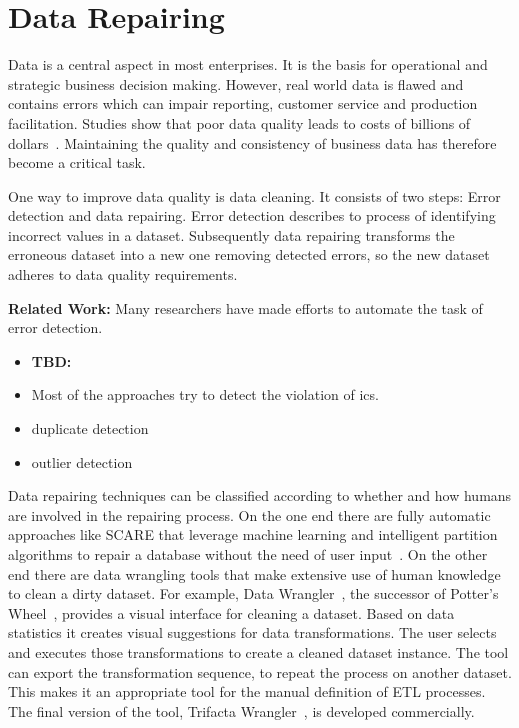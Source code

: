 
\section{Data Repairing}\label{sec:introduction}
  Data is a central aspect in most enterprises.
  It is the basis for operational and strategic business decision making.
  However, real world data is flawed and contains errors which can impair reporting, customer service and production facilitation.
  Studies show that poor data quality leads to costs of billions of dollars~\cite{Redman:quality_disaster, cost_of_low_qual}.
  Maintaining the quality and consistency of business data has therefore become a critical task.

  One way to improve data quality is data cleaning.
  It consists of two steps: Error detection and data repairing.
  Error detection describes to process of identifying incorrect values in a dataset.
  Subsequently data repairing transforms the erroneous dataset into a new one removing detected errors, so the new dataset adheres to data quality requirements.

  \bigskip
  \textbf{Related Work:}
  Many researchers have made efforts to automate the task of error detection.
  \begin{itemize}
    \item \textbf{TBD:}
    \item Most of the approaches try to detect the violation of \glspl{ic}.
    \item duplicate detection
    \item outlier detection
  \end{itemize}

  Data repairing techniques can be classified according to whether and how humans are involved in the repairing process.
  On the one end there are fully automatic approaches like SCARE that leverage machine learning and intelligent partition algorithms to repair a database without the need of user input~\cite{scare}.
  On the other end there are data wrangling tools that make extensive use of human knowledge to clean a dirty dataset.
  For example, Data Wrangler~\cite{data_wrangler}, the successor of Potter's Wheel~\cite{potters_wheel}, provides a visual interface for cleaning a dataset.
  Based on data statistics it creates visual suggestions for data transformations.
  The user selects and executes those transformations to create a cleaned dataset instance.
  The tool can export the transformation sequence, to repeat the process on another dataset.
  This makes it an appropriate tool for the manual definition of ETL processes.
  The final version of the tool, Trifacta Wrangler~\cite{trifacta_wrangler}, is developed commercially.

